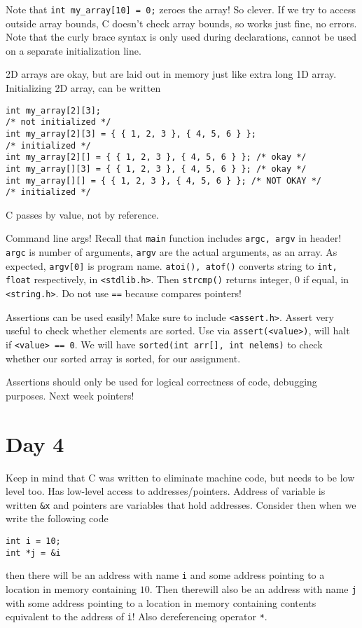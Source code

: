 \documentclass[10pt,landscape, twocolumn]{article}
\begin{document}
Note that \texttt{int my\_array[10] = {0};} zeroes the array! So clever. If we try to access outside array bounds, C doesn't check array bounds, so works just fine, no errors. Note that the curly brace syntax is only used during declarations, cannot be used on a separate initialization line.

2D arrays are okay, but are laid out in memory just like extra long 1D array. Initializing 2D array, can be written
\begin{verbatim}
int my_array[2][3];
/* not initialized */
int my_array[2][3] = { { 1, 2, 3 }, { 4, 5, 6 } };
/* initialized */
int my_array[2][] = { { 1, 2, 3 }, { 4, 5, 6 } }; /* okay */
int my_array[][3] = { { 1, 2, 3 }, { 4, 5, 6 } }; /* okay */
int my_array[][] = { { 1, 2, 3 }, { 4, 5, 6 } }; /* NOT OKAY */
/* initialized */
\end{verbatim}

C passes by value, not by reference.

Command line args! Recall that \texttt{main} function includes \texttt{argc, argv} in header! \texttt{argc} is number of arguments, \texttt{argv} are the actual arguments, as an array. As expected, \texttt{argv[0]} is program name. \texttt{atoi(), atof()} converts string to \texttt{int, float} respectively, in \texttt{<stdlib.h>}. Then \texttt{strcmp()} returns integer, $0$ if equal, in \texttt{<string.h>}. Do not use \texttt{==} because compares pointers!

Assertions can be used easily! Make sure to include \texttt{<assert.h>}. Assert very useful to check whether elements are sorted. Use via \texttt{assert(<value>)}, will halt if \texttt{<value> == 0}. We will have \texttt{sorted(int arr[], int nelems)} to check whether our sorted array is sorted, for our assignment.

Assertions should only be used for logical correctness of code, debugging purposes. Next week pointers!
\section*{Day 4}

Keep in mind that C was written to eliminate machine code, but needs to be low level too. Has low-level access to addresses/pointers. Address of variable is written \texttt{\&x} and pointers are variables that hold addresses. Consider then when we write the following code
\begin{verbatim}
int i = 10;
int *j = &i
\end{verbatim}
then there will be an address with name \texttt{i} and some address pointing to a location in memory containing $10$. Then therewill also be an address with name \texttt{j} with some address pointing to a location in memory containing contents equivalent to the address of \texttt{i}! Also dereferencing operator \texttt{*}.
\end{document}
